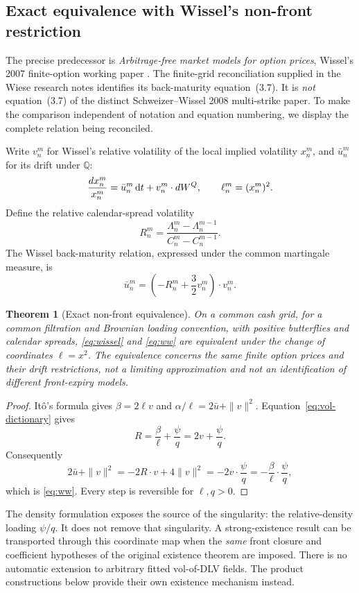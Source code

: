 \documentclass[11pt,a4paper]{article}
\numberwithin{equation}{section}
\newtheorem{theorem}{Theorem}[section]
\theoremstyle{definition}\newtheorem{definition}[theorem]{Definition}
\theoremstyle{remark}\newtheorem{remark}[theorem]{Remark}
\newcommand{\Q}{\mathbb Q}\newcommand{\Pp}{\mathbb P}
\begin{document}
\subsection{Exact equivalence with Wissel's non-front restriction}
The precise predecessor is \emph{Arbitrage-free market models for option prices}, Wissel's 2007 finite-option working paper \cite{Wissel2007}. The finite-grid reconciliation supplied in the Wiese research notes identifies its back-maturity equation~(3.7). It is \emph{not} equation~(3.7) of the distinct Schweizer--Wissel 2008 multi-strike paper. To make the comparison independent of notation and equation numbering, we display the complete relation being reconciled.

Write $v_n^m$ for Wissel's relative volatility of the local implied volatility $x_n^m$, and $\bar u_n^m$ for its drift under $\Q$:
\[
 \frac{dx_n^m}{x_n^m}=\bar u_n^m\,\mathrm dt+v_n^m\cdot dW^Q,
 \qquad \ell_n^m=(x_n^m)^2.
\]
Define the relative calendar-spread volatility
\[
 R_n^m=\frac{\Lambda_n^m-\Lambda_n^{m-1}}{C_n^m-C_n^{m-1}}.
\]
The Wissel back-maturity relation, expressed under the common martingale measure, is
\begin{equation}
 \bar u_n^m=\left(-R_n^m+\frac32v_n^m\right)\cdot v_n^m.
 \label{eq:wissel}
\end{equation}
\begin{theorem}[Exact non-front equivalence]
\label{thm:equivalence}
On a common cash grid, for a common filtration and Brownian loading convention, with positive butterflies and calendar spreads, \eqref{eq:wissel} and \eqref{eq:ww} are equivalent under the change of coordinates $\ell=x^2$. The equivalence concerns the same finite option prices and their drift restrictions, not a limiting approximation and not an identification of different front-expiry models.
\end{theorem}
\begin{proof}
It\^o's formula gives $\beta=2\ell v$ and $\alpha/\ell=2\bar u+\|v\|^2$. Equation~\eqref{eq:vol-dictionary} gives
\[
 R=\frac\beta\ell+\frac\psi q=2v+\frac\psi q.
\]
Consequently
\[
 2\bar u+\|v\|^2
 =-2R\cdot v+4\|v\|^2
 =-2v\cdot\frac\psi q
 =-\frac\beta\ell\cdot\frac\psi q,
\]
which is \eqref{eq:ww}. Every step is reversible for $\ell,q>0$.
\end{proof}
The density formulation exposes the source of the singularity: the relative-density loading $\psi/q$. It does not remove that singularity. A strong-existence result can be transported through this coordinate map when the \emph{same} front closure and coefficient hypotheses of the original existence theorem are imposed. There is no automatic extension to arbitrary fitted vol-of-DLV fields. The product constructions below provide their own existence mechanism instead.
\end{document}
